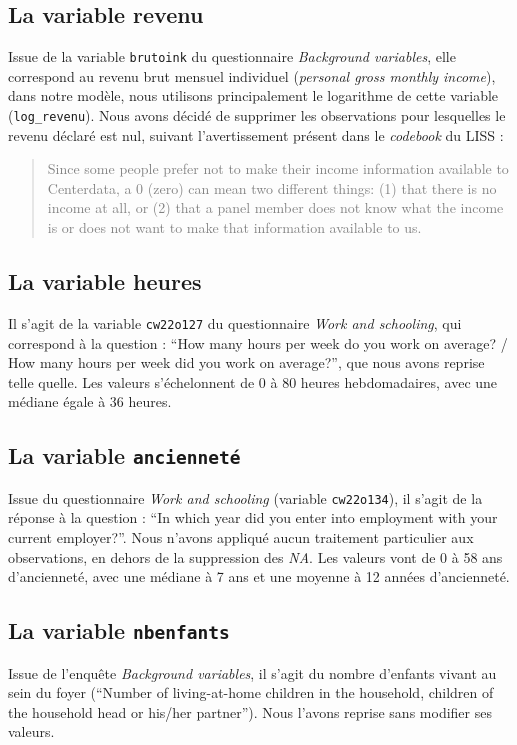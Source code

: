\documentclass[a4paper, french, 11 pt]{article}\usepackage[]{graphicx}\usepackage[]{xcolor}
\begin{document}
\subsection{La variable revenu}

Issue de la variable \texttt{brutoink} du questionnaire \textit{Background variables}, elle correspond au revenu brut mensuel individuel (\textit{personal gross monthly income}), dans notre modèle, nous utilisons principalement le logarithme de cette variable (\verb+log_revenu+). Nous avons décidé de supprimer les observations pour lesquelles le revenu déclaré est nul, suivant l'avertissement présent dans le \textit{codebook} du LISS : 

\begin{quote}
\textcolor{gray}{Since some people prefer not to make their income information available to Centerdata, a 0 (zero) can mean two different things: (1) that there is no income at all, or (2) that a panel member does not know what the income is or does not want to make that information available to us.}
\end{quote}

\subsection{La variable heures}

Il s'agit de la variable \texttt{cw22o127} du questionnaire \textit{Work and schooling}, qui correspond à la question : \enquote{How many hours per week do you work on average? / How many hours per week did you work on average?}, que nous avons reprise telle quelle. Les valeurs s'échelonnent de 0 à 80 heures hebdomadaires, avec une médiane égale à 36 heures.

\subsection{La variable \texttt{ancienneté}}

Issue du questionnaire \textit{Work and schooling} (variable \texttt{cw22o134}), il s'agit de la réponse à la question : \enquote{In which year did you enter into employment with your current employer?}. Nous n'avons appliqué aucun traitement particulier aux observations, en dehors de la suppression des \textit{NA}. Les valeurs vont de 0 à 58 ans d'ancienneté, avec une médiane à 7 ans et une moyenne à 12 années d'ancienneté. 

\subsection{La variable \texttt{nbenfants}}

Issue de l'enquête \textit{Background variables}, il s'agit du nombre d'enfants vivant au sein du foyer (\enquote{Number of living-at-home children in the household, children of the household head or his/her partner}). Nous l'avons reprise sans modifier ses valeurs. 
\end{document}
